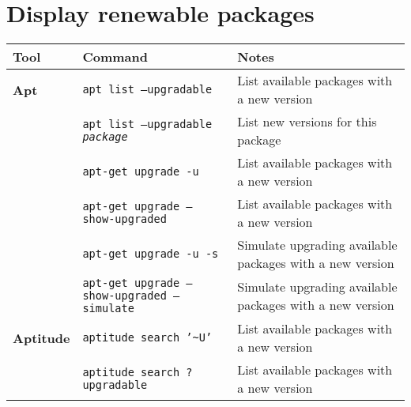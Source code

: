 \documentclass[10pt]{article}
\begin{document}
\newpage

\cheatsheet
\section{Display renewable packages}
\begin{tabular}{ p{3.5cm} p{9cm} p{11cm}}
  \hline
  \rowcolor{Gray}
  \textbf{Tool} & \textbf{Command} & \textbf{Notes} \\
  \hline 
  \textbf{Apt} & \texttt{apt list --upgradable} & List available packages with a new version\\
  \rowcolor{Gray}
  & \texttt{apt list --upgradable \textit{package}} & List new versions for this package\\
  & \texttt{apt-get upgrade -u} & List available packages with a new version \\
  \rowcolor{Gray}
  & \texttt{apt-get upgrade --show-upgraded} & List available packages with a new version \\
  & \texttt{apt-get upgrade -u -s} & Simulate upgrading available packages with a new version \\
  \rowcolor{Gray}
  & \texttt{apt-get upgrade --show-upgraded --simulate} & Simulate upgrading available packages with a new version \\
  \textbf{Aptitude} & \texttt{aptitude search '\textasciitilde{U}'} & List available packages with a new version \\
  \rowcolor{Gray}
  & \texttt{aptitude search ?upgradable} & List available packages with a new version \\
  \hline
\end{tabular}
\end{document}
